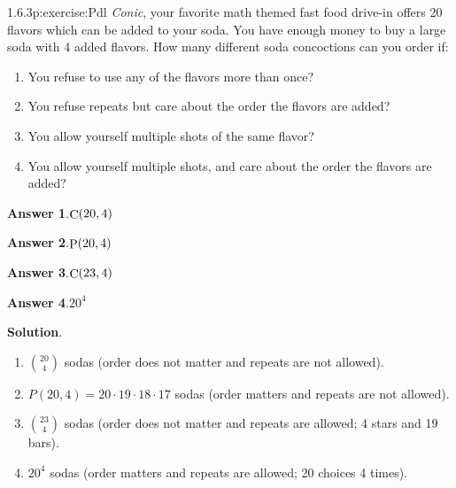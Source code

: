 \documentclass[twoside,11pt,]{book}
\newcommand{\blocktitlefont}{\relax}
\numberwithin{equation}{chapter}
\begin{document}
\begin{divisionsolution}{1.6.3}{}{p:exercise:Pdl}%
\emph{Conic}, your favorite math themed fast food drive-in offers 20 flavors which can be added to your soda. You have enough money to buy a large soda with 4 added flavors. How many different soda concoctions can you order if:%
\begin{enumerate}[label=(\alph*)]
\item{}You refuse to use any of the flavors more than once?%
\item{}You refuse repeats but care about the order the flavors are added?%
\item{}You allow yourself multiple shots of the same flavor?%
\item{}You allow yourself multiple shots, and care about the order the flavors are added?%
\end{enumerate}
%
\par\smallskip%
\noindent\textbf{\blocktitlefont Answer 1}.\quad{}\(\mathop{\rm C}\nolimits\!\left(20,4\right)\)%
\par\smallskip%
\noindent\textbf{\blocktitlefont Answer 2}.\quad{}\(\mathop{\rm P}\nolimits\!\left(20,4\right)\)%
\par\smallskip%
\noindent\textbf{\blocktitlefont Answer 3}.\quad{}\(\mathop{\rm C}\nolimits\!\left(23,4\right)\)%
\par\smallskip%
\noindent\textbf{\blocktitlefont Answer 4}.\quad{}\(20^{4}\)%
\par\smallskip%
\noindent\textbf{\blocktitlefont Solution}.\quad{}%
\begin{enumerate}[label=(\alph*)]
\item{}\({20 \choose 4}\) sodas (order does not matter and repeats are not allowed).%
\item{}\(P(20, 4) = 20\cdot 19\cdot 18 \cdot 17\) sodas (order matters and repeats are not allowed).%
\item{}\({23 \choose 4}\) sodas (order does not matter and repeats are allowed; 4 stars and 19 bars).%
\item{}\(20^4\) sodas (order matters and repeats are allowed; 20 choices 4 times).%
\end{enumerate}
%
\end{divisionsolution}%
\end{document}
